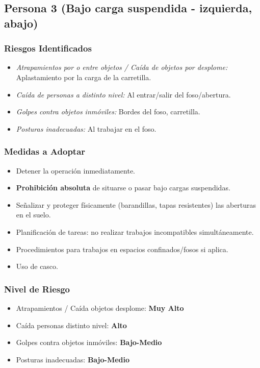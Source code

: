 \documentclass[12pt,a4paper]{article}
\begin{document}
	\bigskip\hrulefill\bigskip
	
	\subsection{Persona 3 (Bajo carga suspendida - izquierda, abajo)}
	
	\subsubsection{Riesgos Identificados}
	\begin{itemize}
		\item \textit{Atrapamientos por o entre objetos / Caída de objetos por desplome:} Aplastamiento por la carga de la carretilla.
		\item \textit{Caída de personas a distinto nivel:} Al entrar/salir del foso/abertura.
		\item \textit{Golpes contra objetos inmóviles:} Bordes del foso, carretilla.
		\item \textit{Posturas inadecuadas:} Al trabajar en el foso.
	\end{itemize}
	
	\subsubsection{Medidas a Adoptar}
	\begin{itemize}
		\item Detener la operación inmediatamente.
		\item \textbf{Prohibición absoluta } de situarse o pasar bajo cargas suspendidas.
		\item Señalizar y proteger físicamente (barandillas, tapas resistentes) las aberturas en el suelo.
		\item Planificación de tareas: no realizar trabajos incompatibles simultáneamente.
		\item Procedimientos para trabajos en espacios confinados/fosos si aplica.
		\item Uso de casco.
	\end{itemize}
	
	\subsubsection{Nivel de Riesgo}
	\begin{itemize}
		\item Atrapamientos / Caída objetos desplome: \textbf{Muy Alto}
		\item Caída personas distinto nivel: \textbf{Alto}
		\item Golpes contra objetos inmóviles: \textbf{Bajo-Medio}
		\item Posturas inadecuadas: \textbf{Bajo-Medio}
	\end{itemize}
	
\end{document}
